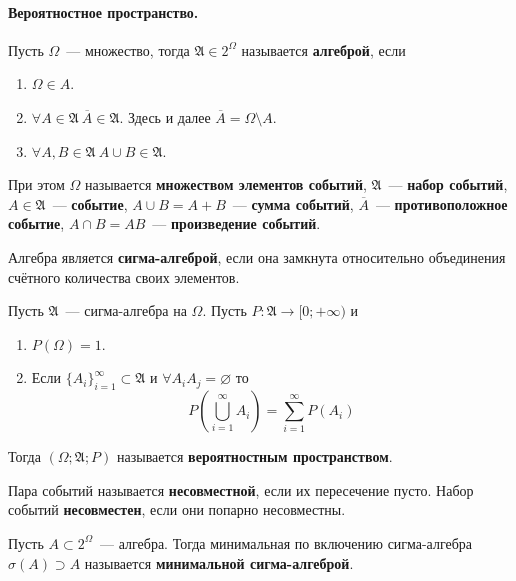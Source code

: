 \documentclass{article}
\newcommand{\A}{{\mathfrak A}}
\begin{document}
    \paragraph{Вероятностное пространство.}
    \begin{definition}
        Пусть $\Omega$~--- множество, тогда $\A\in 2^\Omega$ называется \textbf{алгеброй}, если
        \begin{enumerate}
            \item $\Omega\in A$.
            \item $\forall A\in\mathfrak A~\overline A\in\A$. Здесь и далее $\overline A=\Omega\setminus A$.
            \item $\forall A,B\in\A~A\cup B\in\A$.
        \end{enumerate}
        При этом $\Omega$ называется \textbf{множеством элементов событий}, $\A$~--- \textbf{набор событий}, $A\in\A$~--- \textbf{событие}, $A\cup B=A+B$~--- \textbf{сумма событий}, $\overline A$~--- \textbf{противоположное событие}, $A\cap B=AB$~--- \textbf{произведение событий}.
    \end{definition}
    \begin{definition}
        Алгебра является \textbf{сигма-алгеброй}, если она замкнута относительно объединения счётного количества своих элементов.
    \end{definition}
    \begin{definition}
        Пусть $\A$~--- сигма-алгебра на $\Omega$. Пусть $P\colon \A\to\mathbb [0;+\infty)$ и
        \begin{enumerate}
            \item $P(\Omega)=1$.
            \item Если $\{A_i\}_{i=1}^\infty\subset\A$ и $\forall A_iA_j=\varnothing$ то
            $$
            P\left(\bigcup\limits_{i=1}^\infty A_i\right)=\sum\limits_{i=1}^\infty P(A_i)
            $$
        \end{enumerate}
        Тогда $(\Omega;\A;P)$ называется \textbf{вероятностным пространством}.
    \end{definition}
    \begin{definition}
        Пара событий называется \textbf{несовместной}, если их пересечение пусто. Набор событий \textbf{несовместен}, если они попарно несовместны.
    \end{definition}
    \begin{definition}
        Пусть $A\subset2^\Omega$~--- алгебра. Тогда минимальная по включению сигма-алгебра $\sigma(A)\supset A$ называется \textbf{минимальной сигма-алгеброй}.
    \end{definition}
\end{document}
